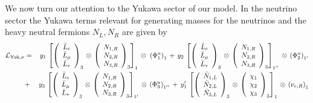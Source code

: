\documentclass[english,10pt,aps,prd,a4paper,preprintnumbers,floatfix,nofootinbib,showpacs,superscriptaddress]{revtex4-1}
\begin{document}
We now turn our attention to the Yukawa sector of our model. In the
neutrino sector the Yukawa terms relevant for generating masses for
the neutrinos and the heavy neutral fermions $N_{L}, N_{R}$ are given
by
\begin{eqnarray}
\mathcal{L}_{\rm{Yuk}, \nu}  & = & y_1 \, \left [  \left( \begin{array}{c} \bar{L}_e  \\ \bar{L}_\mu \\ \bar{L}_\tau \end{array} \right)_{3} \, \otimes \,  \left( \begin{array}{c}  N_{1,R}   \\ N_{2, R} \\ N_{3, R} \end{array} \right)_{3}  \right]_1 \, \otimes \ \left ({\Phi}^u_1 \right)_1   
  \, + \, 
y_2 \,  \left [  \left( \begin{array}{c} \bar{L}_e  \\ \bar{L}_\mu \\ \bar{L}_\tau \end{array} \right)_{3} \, \otimes \,  \left( \begin{array}{c}  N_{1,R}   \\ N_{2, R} \\ N_{3, R} \end{array} \right)_{3}  \right]_{1''} \, \otimes \,  \left ({\Phi}^u_2 \right)_{1'}  
  \nonumber \\
& + &    y_3 \, \left [  \left( \begin{array}{c} \bar{L}_e  \\ \bar{L}_\mu \\ \bar{L}_\tau \end{array} \right)_{3} \, \otimes \,  \left( \begin{array}{c}  N_{1,R}   \\ N_{2, R} \\ N_{3, R} \end{array} \right)_{3}  \right]_{1'} \, \otimes \,   \left ({\Phi}^u_3 \right)_{1''}  
  \, + \,
y'_1 \,   \left [ \left( \begin{array}{c}  \bar{N}_{1,L}   \\ \bar{N}_{2, L} \\ \bar{N}_{3, L} \end{array} \right)_{3} \, \otimes \, \left( \begin{array}{c} \chi_1   \\ \chi_2 \\ \chi_3 \end{array} \right)_{3} \right]_1  \, \otimes \, \left(\nu_{e,R} \right)_1

\end{eqnarray}
\end{document}
